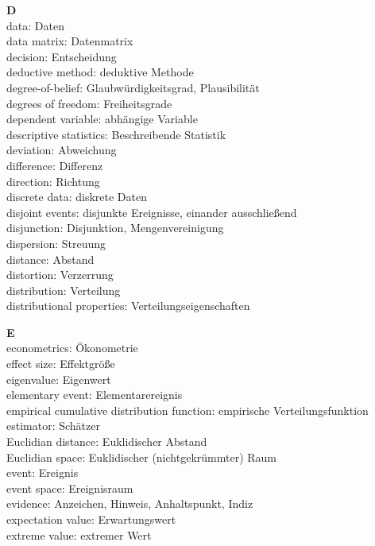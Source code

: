 \medskip
\noindent
{\bf D}\\
data: Daten\\
data matrix: Datenmatrix\\
decision: Entscheidung\\
deductive method: deduktive Methode\\
degree-of-belief: Glaubw\"{u}rdigkeitsgrad, Plausibilit\"{a}t\\
degrees of freedom: Freiheitsgrade\\
dependent variable: abh\"{a}ngige Variable\\
descriptive statistics: Beschreibende Statistik\\
deviation: Abweichung \\
difference: Differenz\\
direction: Richtung\\
discrete data: diskrete Daten\\
disjoint events: disjunkte Ereignisse, einander ausschlie\ss end\\
disjunction: Disjunktion, Mengenvereinigung\\
dispersion: Streuung\\
distance: Abstand\\
distortion: Verzerrung\\
distribution: Verteilung\\
distributional properties: Verteilungseigenschaften

\medskip
\noindent
{\bf E}\\
econometrics: \"{O}konometrie\\
effect size: Effektgr\"{o}\ss e\\
eigenvalue: Eigenwert\\
elementary event: Elementarereignis\\
empirical cumulative distribution function: empirische 
Verteilungsfunktion\\
estimator: Sch\"{a}tzer\\
Euclidian distance: Euklidischer Abstand\\
Euclidian space: Euklidischer (nichtgekr\"{u}mmter) Raum\\
event: Ereignis\\
event space: Ereignisraum\\
evidence: Anzeichen, Hinweis, Anhaltspunkt, Indiz\\
expectation value: Erwartungswert \\
extreme value: extremer Wert

